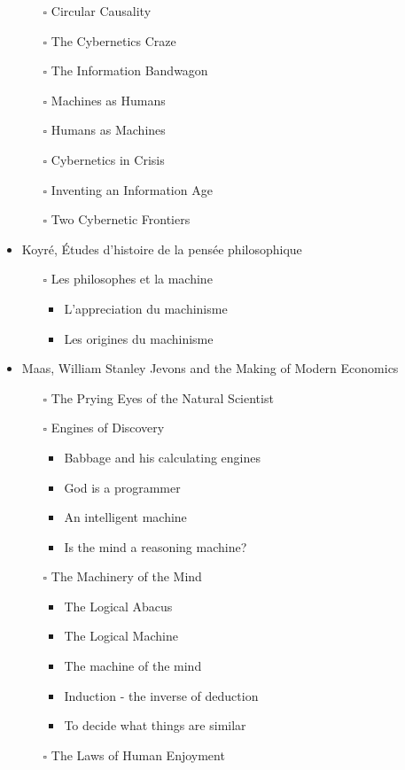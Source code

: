 \documentclass[paper=B6,portrait,twoside=true,twocolumn=false,headinclude=true,footinclude=false,fontsize=12,BCOR=10mm,DIV=calc,pagesize=auto,titlepage=firstiscover,mpinclude=false,headings=normal,headings=twolinechapter,open=right,toc=graduated,chapterprefix=false,numbers=endperiod,parskip=half+]{scrbook}
\theoremstyle{definition}
\begin{document}
\begin{itemize}
\begin{itemize}
\item[{$\square$}] Circular Causality
\item[{$\square$}] The Cybernetics Craze
\item[{$\square$}] The Information Bandwagon
\item[{$\square$}] Machines as Humans
\item[{$\square$}] Humans as Machines
\item[{$\square$}] Cybernetics in Crisis
\item[{$\square$}] Inventing an Information Age
\item[{$\square$}] Two Cybernetic Frontiers
\end{itemize}
\item\relax [0/1] Koyré, Études d'histoire de la pensée philosophique
\begin{itemize}
\item[{$\square$}] Les philosophes et la machine
\begin{itemize}
\item L'appreciation du machinisme
\item Les origines du machinisme
\end{itemize}
\end{itemize}
\item\relax [0/5] Maas, William Stanley Jevons and the Making of Modern Economics
\begin{itemize}
\item[{$\square$}] The Prying Eyes of the Natural Scientist
\item[{$\square$}] Engines of Discovery
\begin{itemize}
\item Babbage and his calculating engines
\item God is a programmer
\item An intelligent machine
\item Is the mind a reasoning machine?
\end{itemize}
\item[{$\square$}] The Machinery of the Mind
\begin{itemize}
\item The Logical Abacus
\item The Logical Machine
\item The machine of the mind
\item Induction - the inverse of deduction
\item To decide what things are similar
\end{itemize}
\item[{$\square$}] The Laws of Human Enjoyment

\end{itemize}
\end{itemize}
\end{document}
